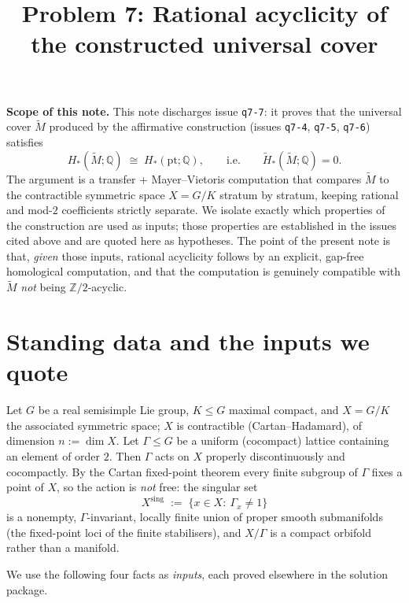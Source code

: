 \documentclass[12pt]{article}
\title{Problem 7: Rational acyclicity of the constructed universal cover}
\author{}
\date{}
\begin{document}
\maketitle

\noindent
\textbf{Scope of this note.}
This note discharges issue \texttt{q7-7}: it proves that the universal cover
$\widetilde M$ produced by the affirmative construction (issues \texttt{q7-4},
\texttt{q7-5}, \texttt{q7-6}) satisfies
\[
  H_*(\widetilde M;\mathbb{Q}) \;\cong\; H_*(\mathrm{pt};\mathbb{Q}),
  \qquad\text{i.e.}\qquad
  \widetilde H_*(\widetilde M;\mathbb{Q})=0 .
\]
The argument is a transfer + Mayer--Vietoris computation that compares
$\widetilde M$ to the contractible symmetric space $X=G/K$ stratum by
stratum, keeping rational and mod-$2$ coefficients strictly separate.
We isolate exactly which properties of the construction are used as inputs;
those properties are established in the issues cited above and are quoted
here as hypotheses. The point of the present note is that, \emph{given} those
inputs, rational acyclicity follows by an explicit, gap-free homological
computation, and that the computation is genuinely compatible with
$\widetilde M$ \emph{not} being $\mathbb{Z}/2$-acyclic.

\bigskip

\section{Standing data and the inputs we quote}\label{sec:data}

Let $G$ be a real semisimple Lie group, $K\le G$ maximal compact, and
$X=G/K$ the associated symmetric space; $X$ is contractible
(Cartan--Hadamard), of dimension $n:=\dim X$. Let $\Gamma\le G$ be a uniform
(cocompact) lattice containing an element of order $2$. Then $\Gamma$ acts on
$X$ properly discontinuously and cocompactly. By the Cartan fixed-point
theorem every finite subgroup of $\Gamma$ fixes a point of $X$, so the action
is \emph{not} free: the singular set
\[
  X^{\mathrm{sing}}\;:=\;\{x\in X:\ \Gamma_x\neq 1\}
\]
is a nonempty, $\Gamma$-invariant, locally finite union of proper smooth
submanifolds (the fixed-point loci of the finite stabilisers), and
$X/\Gamma$ is a compact orbifold rather than a manifold.

We use the following four facts as \emph{inputs}, each proved elsewhere in
the solution package.
\end{document}

